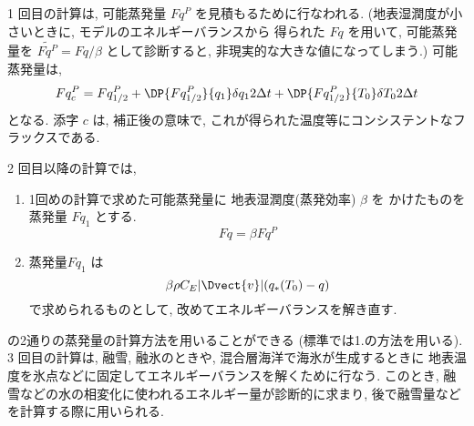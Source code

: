 1 回目の計算は, 可能蒸発量 $Fq^P$ を見積もるために行なわれる.
(地表湿潤度が小さいときに, モデルのエネルギーバランスから
得られた $Fq$ を用いて, 可能蒸発量を
$\widetilde{Fq^P} = Fq / \beta$
として診断すると, 非現実的な大きな値になってしまう.)
可能蒸発量は,
\begin{eqnarray}
  Fq^P_c = Fq^P_{1/2}
       + \DP{Fq^P_{1/2}}{q_1} \delta q_1 2 \Delta t 
       + \DP{Fq^P_{1/2}}{T_0} \delta T_0 2 \Delta t 
\end{eqnarray}
となる.
添字 $c$ は, 補正後の意味で, 
これが得られた温度等にコンシステントなフラックスである.
    
2 回目以降の計算では, 
\begin{enumerate}
\item 1回めの計算で求めた可能蒸発量に
      地表湿潤度(蒸発効率) $\beta$ を
      かけたものを蒸発量 $Fq_1$ とする.
      \begin{equation}
        Fq = \beta Fq^P
      \end{equation}

\item 蒸発量$Fq_1$ は
      \begin{equation}
        \beta \rho C_E |\Dvect{v}| ( q_*(T_0) - q )
      \end{equation}
      で求められるものとして, 
      改めてエネルギーバランスを解き直す.
\end{enumerate}
の2通りの蒸発量の計算方法を用いることができる
(標準では1.の方法を用いる).
3 回目の計算は, 融雪, 融氷のときや, 混合層海洋で海氷が生成するときに
地表温度を氷点などに固定してエネルギーバランスを解くために行なう. 
このとき, 融雪などの水の相変化に使われるエネルギー量が診断的に求まり, 
後で融雪量などを計算する際に用いられる. 

